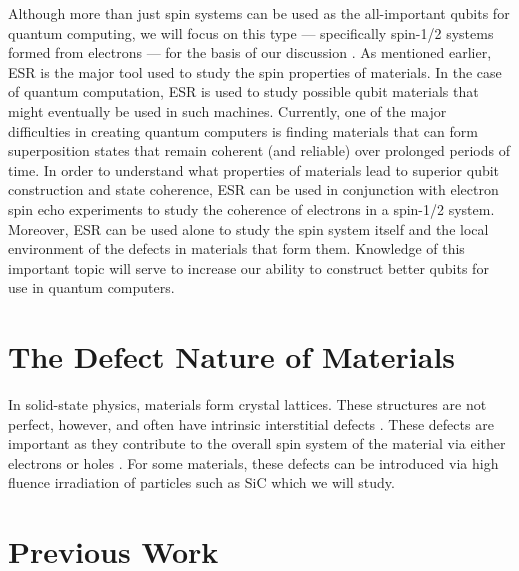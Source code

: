 \documentclass[oneside]{BYUPhys}
\begin{document}
Although more than just spin systems can be used as the all-important qubits for quantum computing, we will focus on this type --- specifically spin-1/2 systems formed from electrons --- for the basis of our discussion \cite{RefWorks:doc:58929612e4b0499fa95c50fa}. As mentioned earlier, ESR is the major tool used to study the spin properties of materials. In the case of quantum computation, ESR is used to study possible qubit materials that might eventually be used in such machines. Currently, one of the major difficulties in creating quantum computers is finding materials that can form superposition states that remain coherent (and reliable) over prolonged periods of time. In order to understand what properties of materials lead to superior qubit construction and state coherence, ESR can be used in conjunction with electron spin echo experiments to study the coherence of electrons in a spin-1/2 system. Moreover, ESR can be used alone to study the spin system itself and the local environment of the defects in materials that form them. Knowledge of this important topic will serve to increase our ability to construct better qubits for use in quantum computers.

\section{The Defect Nature of Materials}

In solid-state physics, materials form crystal lattices. These structures are not perfect, however, and often have intrinsic interstitial defects \cite{RefWorks:doc:58929264e4b0d4c09201f63b}. These defects are important as they contribute to the overall spin system of the material via either electrons or holes \cite{RefWorks:doc:58929816e4b0499fa95c51a6}. For some materials, these defects can be introduced via high fluence irradiation of particles such as SiC which we will study.

\section{Previous Work}
\end{document}
